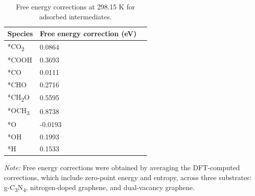 \begin{table}[htbp]
\label{supp_table3:ads_e_correction}
  \caption{Free energy corrections at 298.15 K for adsorbed intermediates.}
  \centering
  \small
  \begin{tabularx}{0.5\textwidth}{@{}lXr@{}}
    \toprule
    Species                & Free energy correction (eV)  \\
    \midrule
    *CO\textsubscript{2}   &  0.0864                      \\
    *COOH                  &  0.3693                      \\
    *CO                    &  0.0111                      \\
    *CHO                   &  0.2716                      \\
    *CH\textsubscript{2}O  &  0.5595                      \\
    *OCH\textsubscript{3}  &  0.8738                      \\
    *O                     & -0.0193                      \\
    *OH                    &  0.1993                      \\
    *H                     &  0.1533                      \\
    \bottomrule
  \end{tabularx}

  \smallskip

  \begin{flushright}  %
  \begin{minipage}{\textwidth}
    \footnotesize\textit{Note:} {Free energy corrections were obtained by averaging the
      DFT-computed corrections, which include zero-point energy and entropy, across three substrates:
      g-C\textsubscript{3}N\textsubscript{4}, nitrogen-doped graphene, and dual-vacancy graphene.}
  \end{minipage}
  \end{flushright}
\end{table}

